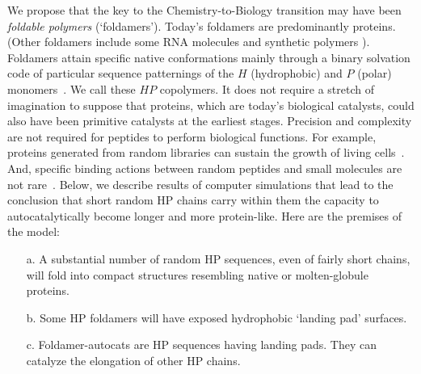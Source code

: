 \documentclass[journal=jacsat,manuscript=article,layout=twocolumn]{achemso}
\begin{document}
 We propose that the key to the Chemistry-to-Biology transition may have been \emph{foldable 
polymers} (`foldamers').  Today's foldamers are predominantly proteins.  (Other foldamers include 
some RNA molecules and synthetic polymers \cite{Lee2005a}).  Foldamers attain specific native 
conformations mainly through a binary solvation code of particular sequence patternings of the $H$ 
(hydrophobic) and $P$ (polar) monomers~\cite{Chan1991}.  We call these $HP$ copolymers.  It does not 
require a stretch of imagination to suppose that proteins, which are today's biological catalysts, 
could also have been primitive catalysts at the earliest stages.  Precision and complexity are not 
required for peptides to perform biological functions.  For example, proteins generated from random 
libraries can sustain the growth of living cells~\cite{Fisher2011}.  And, specific binding actions 
between random peptides and small molecules are not rare~\cite{Cherny2012}.  Below, we describe 
results of computer simulations that lead to the conclusion that short random HP chains carry within 
them the capacity to autocatalytically become longer and more protein-like.  Here are the premises 
of the model:
 
 \begin{itemize}
 \item [a.] A substantial number of random HP sequences, even of fairly short chains, will fold 
into compact structures resembling native or molten-globule proteins.
 \item [b.] Some HP foldamers will have exposed hydrophobic `landing pad' surfaces.
 \item [c.] Foldamer-autocats are HP sequences having landing pads. They can catalyze the 
elongation of other HP chains.
\end{itemize}
\end{document}
